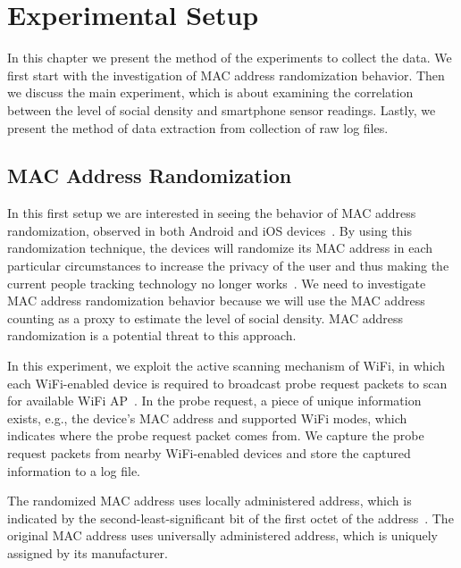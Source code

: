 \chapter{Experimental Setup}
\label{ch:experimental-setup} %

In this chapter we present the method of the experiments to collect the data. We first start with the investigation of \ac{MAC} address randomization behavior. Then we discuss the main experiment, which is about examining the correlation between the level of social density and smartphone sensor readings. Lastly, we present the method of data extraction from collection of raw log files.

\section{MAC Address Randomization} %
\label{sec:mac_address_randomization}
In this first setup we are interested in seeing the behavior of \ac{MAC} address randomization, observed in both Android and iOS devices~\cite{thesis061}. By using this randomization technique, the devices will randomize its \ac{MAC} address in each particular circumstances to increase the privacy of the user and thus making the current people tracking technology no longer works~\cite{thesis079}. We need to investigate \ac{MAC} address randomization behavior because we will use the \ac{MAC} address counting as a proxy to estimate the level of social density. \ac{MAC} address randomization is a potential threat to this approach. 

In this experiment, we exploit the active scanning mechanism of WiFi, in which each WiFi-enabled device is required to broadcast probe request packets to scan for available WiFi \ac{AP}~\cite{thesis082}. In the probe request, a piece of unique information exists, e.g., the device's \ac{MAC} address and supported WiFi modes, which indicates where the probe request packet comes from. We capture the probe request packets from nearby WiFi-enabled devices and store the captured information to a log file.

The randomized \ac{MAC} address uses locally administered address, which is indicated by the second-least-significant bit of the first octet of the address~\cite{thesis082}. The original \ac{MAC} address uses universally administered address, which is uniquely assigned by its manufacturer.

